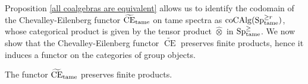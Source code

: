


Proposition \ref{all coalgebras are equivalent} allows us to identify the codomain of the Chevalley-Eilenberg functor $\widetilde{\operatorname{CE}}_{\operatorname{\operatorname{tame}}}$ on tame spectra as $\operatorname{coCAlg}(\operatorname{Sp}^{\geq r}_{\operatorname{\operatorname{tame}}})$, whose categorical product is given by the tensor product $\hat{\otimes}$ in $\operatorname{Sp}^{\geq}_{\operatorname{\operatorname{tame}}}$.
We now show that the Chevalley-Eilenberg functor $\widetilde{\operatorname{CE}}$ preserves finite products, hence it induces a functor on the categories of group objects.
\begin{lemma}
\label{CE preserves products}
	The functor 
	$\widetilde{\operatorname{CE}}_{\operatorname{\operatorname{tame}}}$
	preserves finite products.
\end{lemma}
